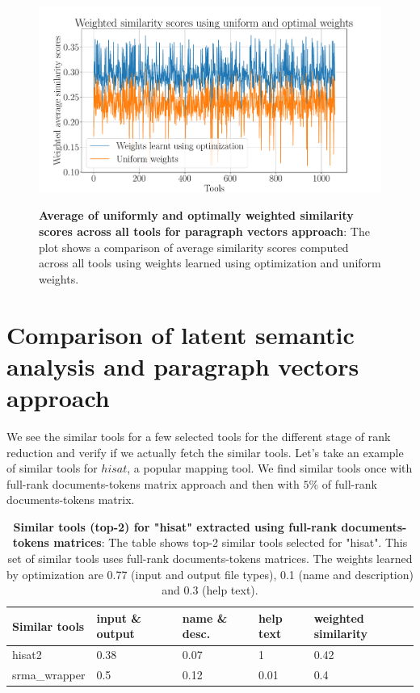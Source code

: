 \begin{figure}[h]
\begin{centering}
    {\includegraphics[scale=0.45]{figures/weighted_optimal_uniform_scores.pdf}}
    \caption[Average of uniformly and optimally weighted similarity scores across all tools for paragraph vectors approach]{\textbf{Average of uniformly and optimally weighted similarity scores across all tools for paragraph vectors approach}: The plot shows a comparison of average similarity scores computed across all tools using weights learned using optimization and uniform weights. }
\end{centering}
\end{figure}

\section{Comparison of latent semantic analysis and paragraph vectors approach}
We see the similar tools for a few selected tools for the different stage of rank reduction and verify if we actually fetch the similar tools. Let's take an example of similar tools for $hisat$, a popular mapping tool. We find similar tools once with full-rank documents-tokens matrix approach and then with $5\%$ of full-rank documents-tokens matrix.

\begin{table}[ht]
\begin{center}
    \begin{tabular}{|l|l|l|l|l|}
        \hline
        Similar tools & input \& output & name \& desc. & help text & weighted similarity \\ \hline
        hisat2   & 0.38 & 0.07 & 1 & 0.42  \\ \hline
        srma\_wrapper & 0.5 & 0.12 & 0.01 & 0.4 \\ \hline
    \end{tabular}
    \end{center}
    \caption[Similar tools (top-2) for "hisat" extracted using full-rank documents-tokens matrices]{\textbf{Similar tools (top-2) for "hisat" extracted using full-rank documents-tokens matrices}: The table shows top-2 similar tools selected for "hisat". This set of similar tools uses full-rank documents-tokens matrices. The weights learned by optimization are 0.77 (input and output file types), 0.1 (name and description) and 0.3 (help text). }
    \label{tab:accuracy}
\end{table}

